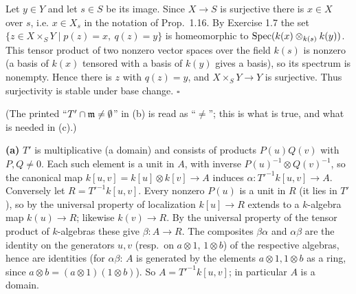 \documentclass[11pt]{article}
\begin{document}
\pf
Let $y\in Y$ and let $s\in S$ be its image. Since $X\to S$ is surjective there is $x\in X$ over $s$, i.e. $x\in X_s$ in the notation of Prop.~1.16. By Exercise 1.7 the set $\{z\in X\times_SY\mid p(z)=x,\ q(z)=y\}$ is homeomorphic to $\operatorname{Spec}(k(x)\otimes_{k(s)}k(y))$. This tensor product of two nonzero vector spaces over the field $k(s)$ is nonzero (a basis of $k(x)$ tensored with a basis of $k(y)$ gives a basis), so its spectrum is nonempty. Hence there is $z$ with $q(z)=y$, and $X\times_SY\to Y$ is surjective. Thus surjectivity is stable under base change. \hfill$\square$

\pf
(The printed ``$T'\cap\mathfrak m\ne\emptyset$'' in (b) is read as ``$\neq$''; this is what is true, and what is needed in (c).)

\textbf{(a)} $T'$ is multiplicative (a domain) and consists of products $P(u)Q(v)$ with $P,Q\neq0$. Each such element is a unit in $A$, with inverse $P(u)^{-1}\otimes Q(v)^{-1}$, so the canonical map $k[u,v]=k[u]\otimes k[v]\to A$ induces $\alpha:T'^{-1}k[u,v]\to A$. Conversely let $R=T'^{-1}k[u,v]$. Every nonzero $P(u)$ is a unit in $R$ (it lies in $T'$), so by the universal property of localization $k[u]\to R$ extends to a $k$-algebra map $k(u)\to R$; likewise $k(v)\to R$. By the universal property of the tensor product of $k$-algebras these give $\beta:A\to R$. The composites $\beta\alpha$ and $\alpha\beta$ are the identity on the generators $u,v$ (resp.\ on $a\otimes1$, $1\otimes b$) of the respective algebras, hence are identities (for $\alpha\beta$: $A$ is generated by the elements $a\otimes1,1\otimes b$ as a ring, since $a\otimes b=(a\otimes1)(1\otimes b)$). So $A=T'^{-1}k[u,v]$; in particular $A$ is a domain.
\end{document}
